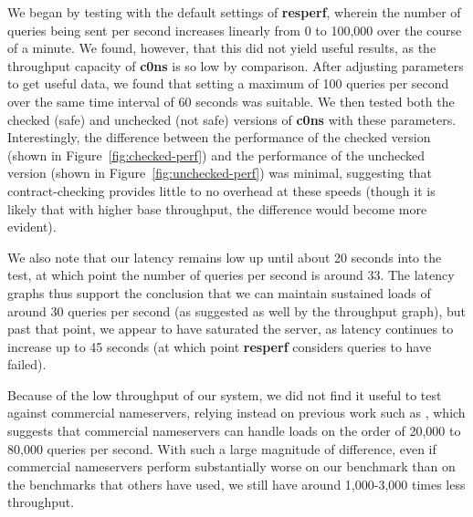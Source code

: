 \documentclass{article}
\newcommand\Kwd[1]{{\sffamily\bfseries{#1}}}
\begin{document}
We began by testing with the default settings of \Kwd{resperf}, wherein the number of queries being sent per second increases linearly from 0 to 100,000 over the course of a minute. We found, however, that this did not yield useful results, as the throughput capacity of \Kwd{c0ns} is so low by comparison. After adjusting parameters to get useful data, we found that setting a maximum of 100 queries per second over the same time interval of 60 seconds was suitable. We then tested both the checked (safe) and unchecked (not safe) versions of \Kwd{c0ns} with these parameters. Interestingly, the difference between the performance of the checked version (shown in Figure~\ref{fig:checked-perf}) and the performance of the unchecked version (shown in Figure~\ref{fig:unchecked-perf}) was minimal, suggesting that contract-checking provides little to no overhead at these speeds (though it is likely that with higher base throughput, the difference would become more evident).

We also note that our latency remains low up until about 20 seconds into the test, at which point the number of queries per second is around 33. The latency graphs thus support the conclusion that we can maintain sustained loads of around 30 queries per second (as suggested as well by the throughput graph), but past that point, we appear to have saturated the server, as latency continues to increase up to 45 seconds (at which point \Kwd{resperf} considers queries to have failed).

Because of the low throughput of our system, we did not find it useful to test against commercial nameservers, relying instead on previous work such as \cite{fagin2017making}, which suggests that commercial nameservers can handle loads on the order of 20,000 to 80,000 queries per second. With such a large magnitude of difference, even if commercial nameservers perform substantially worse on our benchmark than on the benchmarks that others have used, we still have around 1,000-3,000 times less throughput.
\end{document}
